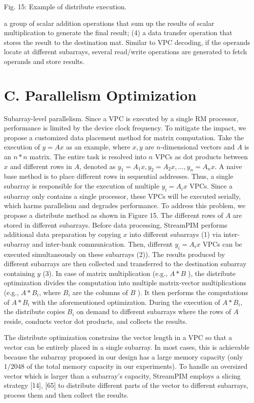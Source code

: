 \documentclass[10pt]{article}
\begin{document}
Fig. 15: Example of distribute execution.

a group of scalar addition operations that sum up the results of scalar multiplication to generate the final result; (4) a data transfer operation that stores the result to the destination mat. Similar to VPC decoding, if the operands locate at different subarrays, several read/write operations are generated to fetch operands and store results.

\section*{C. Parallelism Optimization}
Subarray-level parallelism. Since a VPC is executed by a single RM processor, performance is limited by the device clock frequency. To mitigate the impact, we propose a customized data placement method for matrix computation. Take the execution of $y=A x$ as an example, where $x, y$ are $n$-dimensional vectors and $A$ is an $n * n$ matrix. The entire task is resolved into $n$ VPCs as dot products between $x$ and different rows in $A$, denoted as $y_{1}=A_{1} x, y_{2}=A_{2} x, \ldots, y_{n}=A_{n} x$. A naive base method is to place different rows in sequential addresses. Thus, a single subarray is responsible for the execution of multiple $y_{i}=A_{i} x$ VPCs. Since a subarray only contains a single processor, these VPCs will be executed serially, which harms parallelism and degrades performance. To address this problem, we propose a distribute method as shown in Figure 15. The different rows of $A$ are stored in different subarrays. Before data processing, StreamPIM performs additional data preparation by copying $x$ into different subarrays (1) via inter-subarray and inter-bank communication. Then, different $y_{i}=A_{i} x$ VPCs can be executed simultaneously on these subarrays (2)). The results produced by different subarrays are then collected and transferred to the destination subarray containing $y$ (3). In case of matrix multiplication (e.g., $A * B$ ), the distribute optimization divides the computation into multiple matrix-vector multiplications (e.g., $A * B_{i}$, where $B_{i}$ are the columns of $B$ ). It then performs the computations of $A * B_{i}$ with the aforementioned optimization. During the execution of $A * B_{i}$, the distribute copies $B_{i}$ on demand to different subarrays where the rows of $A$ reside, conducts vector dot products, and collects the results.

The distribute optimization constrains the vector length in a VPC so that a vector can be entirely placed in a single subarray. In most cases, this is achievable because the subarray proposed in our design has a large memory capacity (only $1 / 2048$ of the total memory capacity in our experiments). To handle an oversized vector which is larger than a subarray's capacity, StreamPIM employs a slicing strategy [14], [65] to distribute different parts of the vector to different subarrays, process them and then collect the results.
\end{document}
